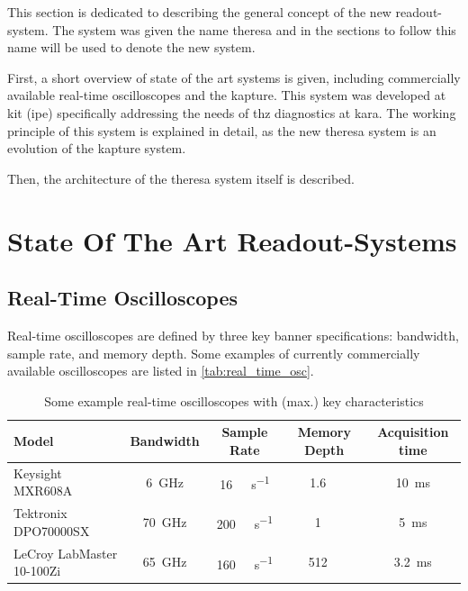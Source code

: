 This section is dedicated to describing the general concept of the new readout-system. 
The system was given the name \gls{theresa} and in the sections to follow  this name will be used to denote the new system.

First, a short overview of state of the art systems is given, including commercially available real-time oscilloscopes and the \gls{kapture}.
This system was developed at \gls{kit} (\gls{ipe}) specifically addressing the needs of \gls{thz} diagnostics at \gls{kara}.
The working principle of this system is explained in detail, as the new \gls{theresa} system is an evolution of the \gls{kapture} system. 

Then, the architecture of the \gls{theresa} system itself is described.

\section{State Of The Art Readout-Systems}

\subsection*{Real-Time Oscilloscopes}
Real-time oscilloscopes are defined by three key banner specifications: bandwidth, sample rate, and memory depth.
Some examples of currently commercially available oscilloscopes are listed in \autoref{tab:real_time_osc}.

\begin{table}[tbh]
	\caption[Real Time Oscilloscopes Examples]{Some example real-time oscilloscopes with (max.) key characteristics}
	\label{tab:real_time_osc}
	\centering
	\begin{tabularx}{\textwidth}{Xcccc}
		\toprule
		\textbf{Model}            & \textbf{Bandwidth} &         \textbf{Sample Rate}         &  \textbf{Memory Depth}  & \textbf{Acquisition time} \\ \midrule
		Keysight MXR608A          &    \SI{6}{\GHz}    & \SI{16}{\giga \sample \per \second}  & \SI{1.6}{\giga \sample} &  \SI{10}{\milli \second}  \\
		Tektronix DPO70000SX      &   \SI{70}{\GHz}    & \SI{200}{\giga \sample \per \second} &  \SI{1}{\giga \sample}  &  \SI{5}{\milli \second}   \\
		LeCroy LabMaster 10-100Zi &   \SI{65}{\GHz}    & \SI{160}{\giga \sample \per \second} & \SI{512}{\mega \sample} & \SI{3.2}{\milli \second}  \\ \bottomrule
	\end{tabularx}
\end{table}

